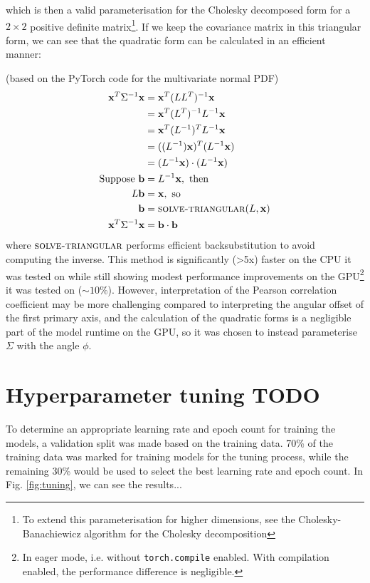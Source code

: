 \documentclass[a4paper, 12pt]{report}
\def\comment#1{\color{red}#1\color{black}}
\begin{document}
which is then a valid parameterisation for the Cholesky decomposed form for a $2\times 2$ positive definite matrix\footnote{To extend this parameterisation for higher dimensions, see the  Cholesky-Banachiewicz algorithm for the Cholesky decomposition}. If we keep the covariance matrix in this triangular form, we can see that the quadratic form can be calculated in an efficient manner:

(based on the PyTorch code for the multivariate normal PDF)
\begin{align}
	\mathbf{x}^T\Sigma^{-1}\mathbf{x}
	&= \mathbf{x}^T(LL^T)^{-1}\mathbf{x}\\
	&= \mathbf{x}^T(L^T)^{-1}L^{-1}\mathbf{x}\\
	&= \mathbf{x}^T(L^{-1})^{T}L^{-1}\mathbf{x}\\
	&= ((L^{-1})\mathbf{x})^T(L^{-1}\mathbf{x})\\
	&= (L^{-1}\mathbf{x})\cdot(L^{-1}\mathbf{x})\\
\textrm{Suppose }\mathbf{b}&=L^{-1}\mathbf{x}, \textrm{ then} \nonumber\\
	L\mathbf{b}&=\mathbf{x}, \textrm{ so}\nonumber\\
	\mathbf{b}&= \textsc{solve-triangular}(L, \mathbf{x})\\
	\mathbf{x}^T\Sigma^{-1}\mathbf{x} &= \mathbf{b}\cdot\mathbf{b}
\end{align}
where $\textsc{solve-triangular}$ performs efficient backsubstitution to avoid computing the inverse. This method is significantly (>5x) faster on the CPU it was tested on while still showing modest performance improvements on the GPU\footnote{In eager mode, i.e. without \lstinline{torch.compile} enabled. With compilation enabled, the performance difference is negligible.} it was tested on ($\sim 10\%$). However, interpretation of the Pearson correlation coefficient may be more challenging compared to interpreting the angular offset of the first primary axis, and the calculation of the quadratic forms is a negligible part of the model runtime on the GPU, so it was chosen to instead parameterise $\Sigma$ with the angle $\phi$.

\newpage
\section{Hyperparameter tuning \comment{TODO} }
\label{sec:hyperparameters}
To determine an appropriate learning rate and epoch count for training the models, a validation split was made based on the training data. 70\% of the training data was marked for training models for the tuning process, while the remaining 30\% would be used to select the best learning rate and epoch count.
In Fig. \ref{fig:tuning}, we can see \comment{the results...}
\end{document}
